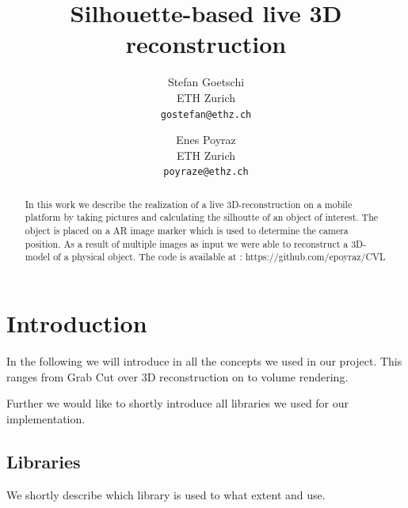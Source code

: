 \documentclass[10pt,twocolumn,letterpaper]{article}
\begin{document}
\title{Silhouette-based live 3D reconstruction}

\author{Stefan Goetschi\\
ETH Zurich\\
{\tt\small gostefan@ethz.ch}
\and
Enes Poyraz\\
ETH Zurich\\
{\tt\small poyraze@ethz.ch}
}

\maketitle

\begin{abstract}
In this work we describe the realization of a live 3D-reconstruction on a mobile platform by taking pictures and calculating the silhoutte of an object of interest. The object is placed on a AR image marker which is used to determine the camera position. As a result of multiple images as input we were able to reconstruct a 3D-model of a physical object. The code is available at : https://github.com/epoyraz/CVL

\end{abstract}

\section{Introduction}

In the following we will introduce in all the concepts we used in our project. This ranges from Grab Cut over 3D reconstruction on to volume rendering.

Further we would like to shortly introduce all libraries we used for our implementation.

\subsection{Libraries}

We shortly describe which library is used to what extent and use.
\end{document}
